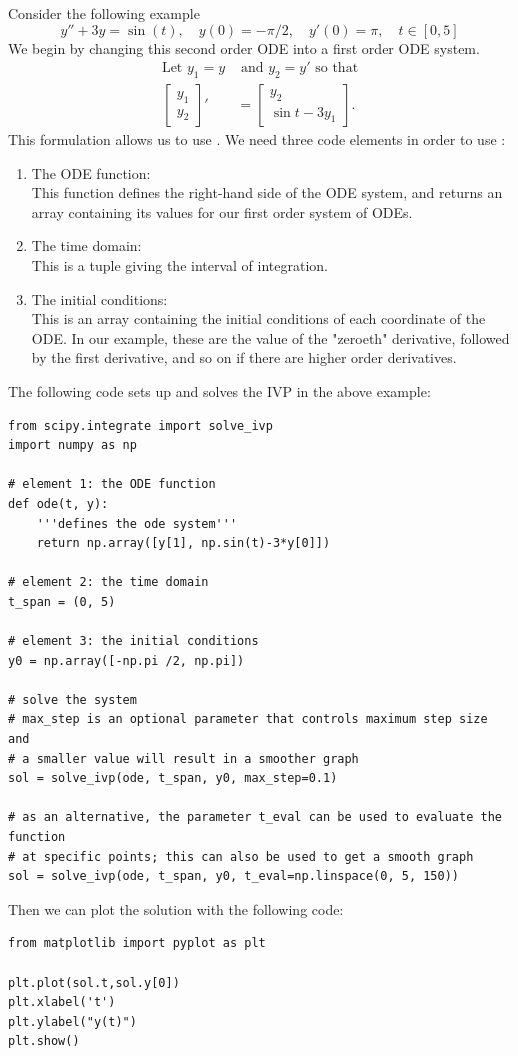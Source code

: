 Consider the following example
\begin{equation*}
    y''+3y = \sin(t), \quad
    y(0) = -\pi /2, \quad
    y'(0) = \pi, \quad
    t \in [0,5]
\end{equation*}
We begin by changing this second order ODE into a first order ODE system.
\begin{align*}
    \text{Let } y_1 = y &\text{ and } y_2 = y' \text{ so that}\\
    \begin{bmatrix}
        y_1\\y_2
    \end{bmatrix}'
    &=
    \begin{bmatrix}
        y_2 \\
        \sin{t} - 3y_1
    \end{bmatrix}.
\end{align*}
This formulation allows us to use .
We need three code elements in order to use :
\begin{enumerate}
    \item The ODE function: \\
    This function defines the right-hand side of the ODE system, and returns an array containing its values for our first order system of ODEs.
    \item The time domain: \\
    This is a tuple giving the interval of integration.
    \item The initial conditions: \\
    This is an array containing the initial conditions of each coordinate of the ODE.
    In our example, these are the value of the "zeroeth" derivative, followed by the first derivative, and so on if there are higher order derivatives.
\end{enumerate}
The following code sets up and solves the IVP in the above example:
\begin{lstlisting}
from scipy.integrate import solve_ivp
import numpy as np

# element 1: the ODE function
def ode(t, y):
    '''defines the ode system'''
    return np.array([y[1], np.sin(t)-3*y[0]])

# element 2: the time domain
t_span = (0, 5)

# element 3: the initial conditions
y0 = np.array([-np.pi /2, np.pi])

# solve the system
# max_step is an optional parameter that controls maximum step size and
# a smaller value will result in a smoother graph
sol = solve_ivp(ode, t_span, y0, max_step=0.1)

# as an alternative, the parameter t_eval can be used to evaluate the function
# at specific points; this can also be used to get a smooth graph
sol = solve_ivp(ode, t_span, y0, t_eval=np.linspace(0, 5, 150))
\end{lstlisting}
Then we can plot the solution with the following code:
\begin{lstlisting}
from matplotlib import pyplot as plt

plt.plot(sol.t,sol.y[0])
plt.xlabel('t')
plt.ylabel("y(t)")
plt.show()
\end{lstlisting}

